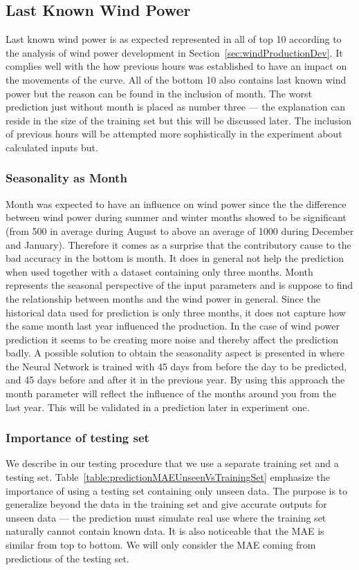 \subsection{Last Known Wind Power}
Last known wind power is as expected represented in all of top 10 according to the analysis of wind power development in Section~\ref{sec:windProductionDev}. It complies well with the how previous hours was established to have an impact on the movements of the curve. All of the bottom 10 also contains last known wind power but the reason can be found in the inclusion of month. The worst prediction just without month is placed as number three --- the explanation can reside in the size of the training set but this will be discussed later. The inclusion of previous hours will be attempted more sophistically in the experiment about calculated inputs but.

\subsubsection{Seasonality as Month}
Month was expected to have an influence on wind power since the the difference between wind power during summer and winter months showed to be significant (from 500 in average during August to above an average of 1000 during December and January). Therefore it comes as a surprise that the contributory cause to the bad accuracy in the bottom is month. It does in general not help the prediction when used together with a dataset containing only three months. Month represents the seasonal perspective of the input parameters and is suppose to find the relationship between months and the wind power in general. Since the historical data used for prediction is only three months, it does not capture how the same month last year influenced the production. In the case of wind power prediction it seems to be creating more noise and thereby affect the prediction badly. A possible solution to obtain the seasonality aspect is presented in\cite{pjmForecast} where the Neural Network is trained with 45 days from before the day to be predicted, and 45 days before and after it in the previous year. By using this approach the month parameter will reflect the influence of the months around you from the last year. This will be validated in a prediction later in experiment one.

\subsubsection{Importance of testing set}
We describe in our testing procedure that we use a separate training set and a testing set. Table~\ref{table:predictionMAEUnseenVsTrainingSet} emphasize the importance of using a testing set containing only unseen data. The purpose is to generalize beyond the data in the training set and give accurate outputs for unseen data \cite{1} --- the prediction must simulate real use where the training set naturally cannot contain known data. It is also noticeable that the MAE is similar from top to bottom. We will only consider the MAE coming from predictions of the testing set.

